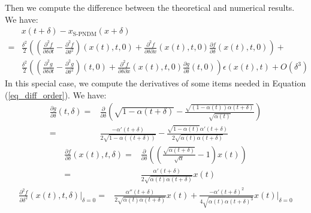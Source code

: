 \documentclass{article}
\begin{document}
Then we compute the difference between the theoretical and numerical results. We have:
\begin{equation}
   \begin{split}
        & x(t+\delta) - x_{\text{S-PNDM}}(x+\delta) \\
       =& \frac{\delta^2}{2}\left((\frac{\partial^2 f}{\partial \delta\partial t}-\frac{\partial^2 f}{\partial \delta^2})(x(t),t,0) +\frac{\partial^2 f}{\partial \delta\partial x}(x(t),t,0)\frac{\partial f}{\partial \delta}(x(t),t,0)\right) + \\
       & \frac{\delta^2}{2}\left((\frac{\partial^2 g}{\partial \delta\partial t}-\frac{\partial^2 g}{\partial \delta^2})(t,0) + \frac{\partial^2 f}{\partial \delta\partial x}(x(t),t,0)\frac{\partial g}{\partial \delta}(t,0)\right)\epsilon(x(t),t) + O(\delta^3)
   \end{split}
   \label{eq_diff_order}
\end{equation}
In this special case, we compute the derivatives of some items needed in Equation (\ref{eq_diff_order}). We have:
\begin{equation}
   \begin{split}
       \frac{\partial g}{\partial \delta}(t, \delta) =& \frac{\partial}{\partial \delta}\left(\sqrt{1-\alpha(t+\delta)} - \frac{\sqrt{(1-\alpha(t))\alpha(t+\delta)}}{\sqrt{\alpha(t)}}\right) \\
                                                     =& \frac{-\alpha'(t+\delta)}{2\sqrt{1-\alpha((t+\delta))}} - \frac{\sqrt{1-\alpha(t)}\alpha'(t+\delta)}{2\sqrt{\alpha(t)\alpha(t+\delta)}}
   \end{split}
\end{equation}
\begin{equation}
   \begin{split}
       \frac{\partial f}{\partial \delta}(x(t), t, \delta) =& \frac{\partial}{\partial \delta}\left(\left(\frac{\sqrt{\alpha(t+\delta)}}{\sqrt{\alpha}}-1\right)x(t)\right) \\
                                                           =& \frac{\alpha'(t+\delta)}{2\sqrt{\alpha(t)\alpha(t+\delta)}}x(t)
   \end{split}
\end{equation}
\begin{equation}
   \begin{split}
       \frac{\partial^2 f}{\partial \delta^2}(x(t),t,\delta)|_{\delta=0} =&\frac{\alpha''(t+\delta)}{2\sqrt{\alpha(t)\alpha(t+\delta)}}x(t) + \frac{-\alpha'(t+\delta)^2}{4\sqrt{\alpha(t)\alpha(t+\delta)^3}}x(t)|_{\delta=0} 
   \end{split}
\end{equation}
\end{document}
